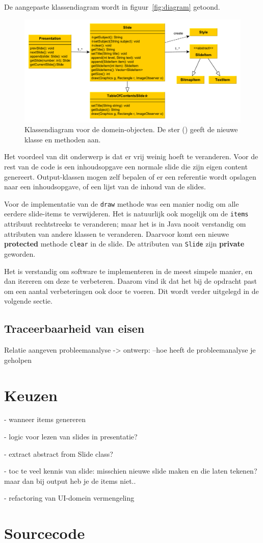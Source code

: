 \documentclass[a4paper]{article}
\newcommand{\code}[1]{\lstinline[columns=fixed]{#1}}
\begin{document}
De aangepaste klassendiagram wordt in figuur~\ref{fig:diagram} getoond.
\begin{figure}
 \caption{
    Klassendiagram voor de domein-objecten.\label{fig:design}
    De ster (\star) geeft de nieuwe klasse en methoden aan.
 }
 \centering \includegraphics[width=\textwidth]{Diagrams/design.pdf}
\end{figure}

Het voordeel van dit onderwerp is dat er vrij weinig hoeft te veranderen.
Voor de rest van de code is een inhoudsopgave een normale slide die zijn eigen content genereert.
Output-klassen mogen zelf bepalen of er een referentie wordt opslagen naar een inhoudsopgave, of een lijst van de inhoud van de slides.

Voor de implementatie van de \code{draw} methode was een manier nodig om alle eerdere slide-items te verwijderen.
Het is natuurlijk ook mogelijk om de \code{items} attribuut rechtstreeks te veranderen;
maar het is in Java nooit verstandig om attributen van andere klassen te veranderen.
Daarvoor komt een nieuwe \textbf{protected} methode \code{clear} in de slide.
De attributen van \code{Slide} zijn \textbf{private} geworden.

Het is verstandig om software te implementeren in de meest simpele manier, en dan itereren om deze te verbeteren.
Daarom vind ik dat het bij de opdracht past om een aantal verbeteringen ook door te voeren.
Dit wordt verder uitgelegd in de volgende sectie.

\subsection{Traceerbaarheid van eisen}
Relatie aangeven probleemanalyse 
-> ontwerp: 
–hoe heeft de probleemanalyse je geholpen 

\section{Keuzen}
- wanneer items genereren

- logic voor lezen van slides in presentatie?

- extract abstract from Slide class?

- toc te veel kennis van slide: misschien nieuwe slide maken en die laten tekenen? maar dan bij output heb je de items niet..

- refactoring van UI-domein vermengeling

\section{Sourcecode}
\end{document}
